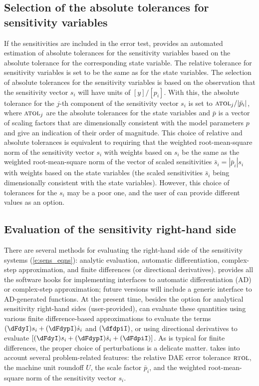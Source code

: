 \subsection{Selection of the absolute tolerances for sensitivity variables}
If the sensitivities are included in the error
test, {\idas} provides an
automated estimation of absolute tolerances for the sensitivity variables 
based on the absolute tolerance for the corresponding state variable.
The relative tolerance for sensitivity variables is set to be the same as for 
the state variables. The selection of absolute tolerances for the sensitivity 
variables is based on the observation that the sensitivity vector $s_i$ will have 
units of $[y]/[p_i]$.
With this, the absolute tolerance for the $j$-th component of the sensitivity
vector $s_i$ is set to ${\mbox{\sc atol}_j}/{|{\bar p}_i|}$, where
$\mbox{\sc atol}_j$ are the absolute tolerances for the state variables and $\bar p$
is a vector of scaling factors that are dimensionally consistent with
the model parameters $p$ and give an indication of their order of magnitude.
This choice of relative and absolute tolerances is equivalent 
to requiring that the weighted root-mean-square norm of the sensitivity 
vector $s_i$ with weights based on $s_i$ be the same as the
weighted root-mean-square norm of the vector of scaled sensitivities 
${\bar s}_i = |{\bar p}_i| s_i$ with weights based on the state variables
(the scaled sensitivities ${\bar s}_i$ being dimensionally consistent with the
state variables).
%
However, this choice of tolerances for the $s_i$ may be a poor one, and the user 
of {\idas} can provide different values as an option.

\subsection{Evaluation of the sensitivity right-hand side}
There are several methods for evaluating the right-hand side of the sensitivity 
systems (\ref{e:sens_eqns}): analytic evaluation, automatic differentiation, 
complex-step approximation, and finite differences (or directional derivatives).
{\idas} provides all the software hooks for implementing interfaces to
automatic differentiation (AD) or complex-step approximation; future versions
will include a generic interface to AD-generated functions.
At the present time, besides the option for analytical sensitivity right-hand 
sides (user-provided), {\idas} can evaluate these quantities using various
finite difference-based approximations to evaluate the terms $(\dFdyI) s_i + (\dFdypI) \dot s_i$ 
and $(\dfdpiI)$, or using directional derivatives to evaluate
$\left[ (\dFdyI) s_i + (\dFdypI) \dot s_i + (\dFdpiI) \right]$.
As is typical for finite differences, the proper choice of perturbations is a 
delicate matter. {\idas} takes into account several problem-related features:
the relative DAE error tolerance $\mbox{\sc rtol}$, the machine unit roundoff $U$,
the scale factor ${\bar p}_i$, and the weighted root-mean-square norm of the 
sensitivity vector $s_i$.

